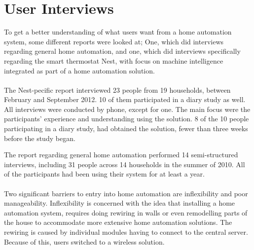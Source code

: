 \section{User Interviews}
\label{sec:interviewReports}
To get a better understanding of what users want from a home automation system, some different reports were looked at; One, which did interviews regarding general home automation\cite{HAInterviews}, and one, which did interviews specifically regarding the smart thermostat Nest, with focus on machine intelligence integrated as part of a home automation solution\cite{AdaptiveInterviews}.
\\\\
The Nest-pecific report interviewed 23 people from 19 households, between February and September 2012. 10 of them participated in a diary study as well. All interviews were conducted by phone, except for one. The main focus were the participants' experience and understanding using the solution. 8 of the 10 people participating in a diary study, had obtained the solution, fewer than three weeks before the study began\cite{AdaptiveInterviews}.

The report regarding general home automation performed 14 semi-structured interviews, including 31 people across 14 households in the summer of 2010. All of the participants had been using their system for at least a year\cite{HAInterviews}.
\\\\
Two significant barriers to entry into home automation are inflexibility and poor manageability\cite{HAInterviews}. Inflexibility is concerned with the idea that installing a home automation system, requires doing rewiring in walls or even remodelling parts of the house to accommodate more extensive home automation solutions. The rewiring is caused by individual modules having to connect to the central server. Because of this, users switched to a wireless solution\cite{HAInterviews}.

